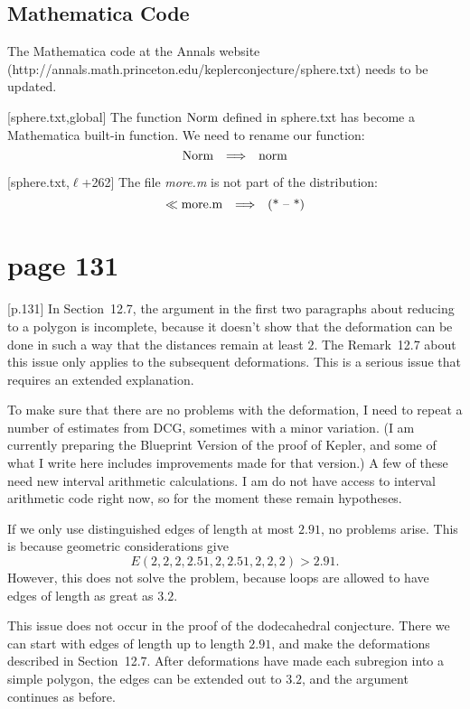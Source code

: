 \documentclass[11pt]{amsart}
\def\op#1{{\text{#1}}}
\def\to{{\quad\Longrightarrow\quad}}
\def\line{$\ell$}
\def\text{\hbox}
\begin{document}
\subsection{Mathematica Code}

The Mathematica code at the Annals website
(http://annals.math.princeton.edu/keplerconjecture/sphere.txt) needs to be updated.

[sphere.txt,global]
The function $\op{Norm}$ defined in sphere.txt
has become a Mathematica built-in function.
We need to rename our function: 
	$$\op{Norm} \to \op{norm}$$
	
[sphere.txt,\line+262]
The file {\it more.m} is not part of the distribution:
	$$\ll \op{more.m} \to \op{(* -- *)}$$




\section{page 131}

[p.131]
In Section~12.7, the argument in the first two
paragraphs about reducing to a polygon is incomplete, because it doesn't show that the deformation can be done in such a way that the distances remain at least $2$.  The Remark~12.7 about this issue only applies to the subsequent 
deformations.  This is a serious issue that requires an extended explanation.

To make sure that there are no problems with the deformation,
I need to repeat a number of estimates from DCG, sometimes with
a minor variation.  (I am currently preparing the Blueprint
Version of the proof of Kepler, and some of what I write here
includes improvements made for that version.)  A few of
these need new interval arithmetic calculations.  I am
do not have access to interval arithmetic code right now, so for the moment these remain hypotheses.


If we only use distinguished edges of length
at most $2.91$, no problems arise.  This is
because geometric considerations give
  $$E(2,2,2,2.51,2,2.51,2,2,2) > 2.91.$$
However, this does not solve the problem, because
loops are allowed to have edges of length as
great as $3.2$.

This issue does not occur in the proof of the dodecahedral conjecture.  There we can start with edges of length up to length $2.91$, and make the deformations described in Section~12.7.  After deformations have made each subregion into a simple polygon, the edges can be extended out to $3.2$, and the argument continues as before.
\end{document}
